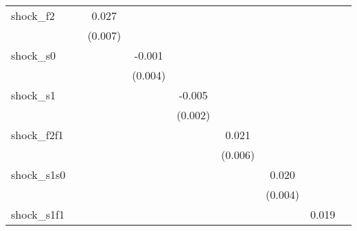 {\begin{tabular}{l*{8}{c}}
\addlinespace
shock\_f2    &                     &       0.027\sym{***}&                     &                     &                     &                     &                     &                     \\
            &                     &     (0.007)         &                     &                     &                     &                     &                     &                     \\
\addlinespace
shock\_s0    &                     &                     &      -0.001         &                     &                     &                     &                     &                     \\
            &                     &                     &     (0.004)         &                     &                     &                     &                     &                     \\
\addlinespace
shock\_s1    &                     &                     &                     &      -0.005\sym{**} &                     &                     &                     &                     \\
            &                     &                     &                     &     (0.002)         &                     &                     &                     &                     \\
\addlinespace
shock\_f2f1  &                     &                     &                     &                     &       0.021\sym{***}&                     &                     &                     \\
            &                     &                     &                     &                     &     (0.006)         &                     &                     &                     \\
\addlinespace
shock\_s1s0  &                     &                     &                     &                     &                     &       0.020\sym{***}&                     &                     \\
            &                     &                     &                     &                     &                     &     (0.004)         &                     &                     \\
\addlinespace
shock\_s1f1  &                     &                     &                     &                     &                     &                     &       0.019\sym{**} &                     \\

\end{tabular}}

